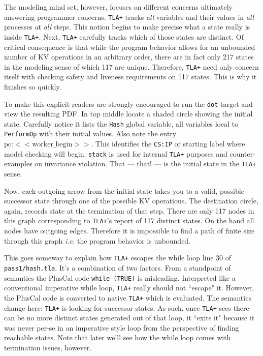 \documentclass[twocolumn]{article}
\begin{document}
The modeling mind set, however, focuses on different concerns ultimately answering programmer concerns. \texttt{TLA+} tracks \emph{all} variables and their values in \emph{all} processes at \emph{all} steps. This notion begins to make precise what a state really is inside \texttt{TLA+}. Next, \texttt{TLA+} carefully tracks which of those states are distinct. Of critical consequence is that while the program behavior allows for an unbounded number of KV operations in an arbitrary order, there are in fact only 217 states in the modeling sense of which 117 are unique. Therefore, \texttt{TLA+} need only concern itself with checking safety and liveness requirements on 117 states. This is why it finishes so quickly.

To make this explicit readers are strongly encouraged to run the \texttt{dot} target and view the resulting PDF. In top middle locate a shaded circle showing the initial state. Carefully notice it lists the \texttt{Hash} global variable, all variables local to \texttt{PerformOp} with their initial values. Also note the entry $\text{pc:}<<\text{worker\_begin}>>$. This identifies the \texttt{CS:IP} or starting label where model checking will begin. \texttt{stack} is used for internal \texttt{TLA+} purposes and counter-examples on invariance violation.
That --- that! --- is the initial state in the \texttt{TLA+} sense. 

Now, each outgoing arrow from the initial state takes you to a valid, possible successor state through one of the possible KV operations. The destination circle, again, records state at the termination of that step. There are only 117 nodes in this graph corresponding to \texttt{TLA+}'s report of 117 distinct states. On the hand all nodes have outgoing edges. Therefore it is impossible to find a path of finite size through this graph \emph{i.e.} the program behavior is unbounded. 

This goes someway to explain how \texttt{TLA+} escapes the while loop line 30 of \texttt{pass1/hash.tla}. It's a combination of two factors. From a standpoint of semantics the PlusCal code \texttt{while (TRUE)} is misleading. Interpreted like a conventional imperative while loop, \texttt{TLA+} really should not ``escape" it. However, the PlusCal code is converted to native \texttt{TLA+} which is evaluated. The semantics change here: \texttt{TLA+} is looking for successor states. As such, once \texttt{TLA+} sees there can be no more distinct states generated out of that loop, it ``exits it" because it was never per-se in an imperative style loop from the perspective of finding reachable states. Note that later we'll see how the while loop comes with termination issues, however.
\end{document}
